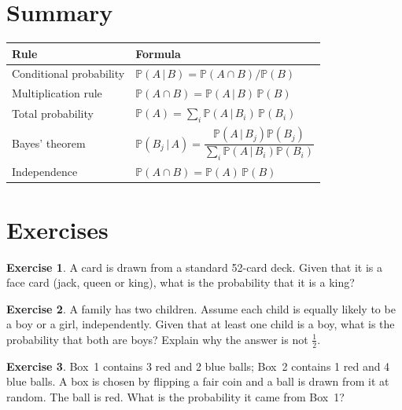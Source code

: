 \documentclass[11pt,letterpaper]{article}
\theoremstyle{definition}
\newtheorem{exercise}{Exercise}
\theoremstyle{plain}
\newcommand{\Prob}{\mathbb{P}}
\newcommand{\given}{\,\vert\,}
\begin{document}
\section{Summary}

\begin{center}
\renewcommand{\arraystretch}{1.5}
\begin{tabular}{@{}ll@{}}
  \toprule
  Rule & Formula \\
  \midrule
  Conditional probability & $\Prob(A \given B) = \Prob(A \cap B)/\Prob(B)$ \\
  Multiplication rule & $\Prob(A \cap B) = \Prob(A \given B)\,\Prob(B)$ \\
  Total probability & $\Prob(A) = \sum_i \Prob(A \given B_i)\,\Prob(B_i)$ \\
  Bayes' theorem & $\Prob(B_j \given A) = \dfrac{\Prob(A \given B_j)\Prob(B_j)}{\sum_i \Prob(A \given B_i)\Prob(B_i)}$ \\
  Independence & $\Prob(A \cap B) = \Prob(A)\,\Prob(B)$ \\
  \bottomrule
\end{tabular}
\end{center}

\section{Exercises}

\begin{exercise}
A card is drawn from a standard 52-card deck. Given that it is a face card (jack, queen or king), what is the probability that it is a king?
\end{exercise}

\begin{exercise}
A family has two children. Assume each child is equally likely to be a boy or a girl, independently. Given that at least one child is a boy, what is the probability that both are boys? Explain why the answer is not $\frac12$.
\end{exercise}

\begin{exercise}
Box~1 contains 3 red and 2 blue balls; Box~2 contains 1 red and 4 blue balls. A box is chosen by flipping a fair coin and a ball is drawn from it at random. The ball is red. What is the probability it came from Box~1?
\end{exercise}
\end{document}
